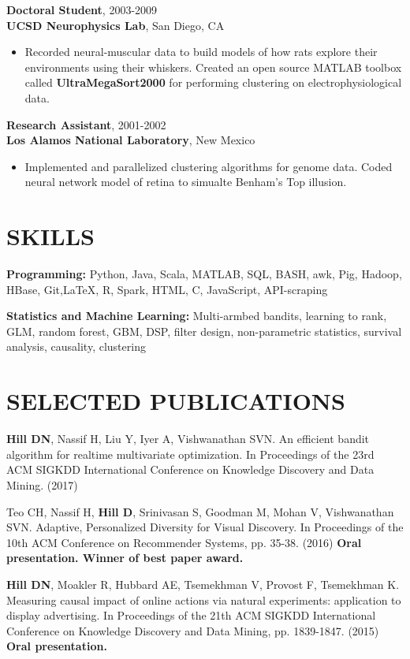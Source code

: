 \documentclass[line,10pt]{res}
\begin{document}
\begin{resume}
{\bf Doctoral Student}, 2003-2009 \\ 
{\bf UCSD Neurophysics Lab}, San Diego, CA 
  \begin{itemize}
        \item[] {\small Recorded neural-muscular data to build models of how rats explore their environments using their whiskers.  Created an open source MATLAB toolbox called \textbf{UltraMegaSort2000} for performing clustering on electrophysiological data.}
\end{itemize}    
    
   {\bf Research Assistant}, 2001-2002 \\ {\bf Los Alamos National Laboratory}, New Mexico  
  \begin{itemize}
        \item[] {\small Implemented and parallelized clustering algorithms for genome data. Coded neural network model of retina to simualte Benham's Top illusion. }
  \end{itemize}
\section{SKILLS} 
{\bf Programming:} {\small Python, Java, Scala, MATLAB, SQL, BASH, awk, Pig, Hadoop, HBase, Git,\LaTeX, R, Spark, HTML, C, JavaScript, API-scraping}

{\bf Statistics and Machine Learning: } {\small Multi-armbed bandits, learning to rank, GLM, random forest, GBM, DSP, filter design, non-parametric statistics, survival analysis, causality, clustering}
    
\section{SELECTED PUBLICATIONS} 
\textbf{Hill DN}, Nassif H, Liu Y, Iyer A, Vishwanathan SVN. An efficient bandit algorithm for realtime multivariate optimization. In Proceedings of the 23rd ACM SIGKDD International Conference on Knowledge Discovery and Data Mining. (2017)

Teo CH, Nassif H, \textbf{Hill D}, Srinivasan S, Goodman M, Mohan V, Vishwanathan SVN. Adaptive, Personalized Diversity for Visual Discovery. In Proceedings of the 10th ACM Conference on Recommender Systems, pp. 35-38. (2016) \textbf{Oral presentation. Winner of best paper award.}

\textbf{Hill DN}, Moakler R, Hubbard AE, Tsemekhman V, Provost F, Tsemekhman K.  Measuring causal impact of online actions via natural experiments: application to display advertising. In Proceedings of the 21th ACM SIGKDD International Conference on Knowledge Discovery and Data Mining, pp. 1839-1847. (2015) \textbf{Oral presentation.}

\end{resume}
\end{document}
